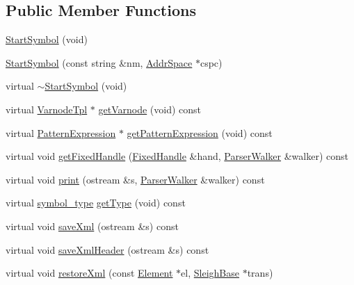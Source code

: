 \subsection*{Public Member Functions}
\begin{DoxyCompactItemize}
\item 
\mbox{\hyperlink{class_start_symbol_a038b771f197b5218dedf7aa2ee41aa9f}{Start\+Symbol}} (void)
\item 
\mbox{\hyperlink{class_start_symbol_a2b7b7d19a42d3d5d0c271c81f4a35d31}{Start\+Symbol}} (const string \&nm, \mbox{\hyperlink{class_addr_space}{Addr\+Space}} $\ast$cspc)
\item 
virtual \mbox{\hyperlink{class_start_symbol_a0154c71a007b7c4dd3e57e4016fc65fc}{$\sim$\+Start\+Symbol}} (void)
\item 
virtual \mbox{\hyperlink{class_varnode_tpl}{Varnode\+Tpl}} $\ast$ \mbox{\hyperlink{class_start_symbol_a1f8a44a3f3f69018161563f7dc0a4d74}{get\+Varnode}} (void) const
\item 
virtual \mbox{\hyperlink{class_pattern_expression}{Pattern\+Expression}} $\ast$ \mbox{\hyperlink{class_start_symbol_aeeb32a702943ac0da1178cdf97e7002f}{get\+Pattern\+Expression}} (void) const
\item 
virtual void \mbox{\hyperlink{class_start_symbol_addda2db4266dfadb0158a6a305edff69}{get\+Fixed\+Handle}} (\mbox{\hyperlink{struct_fixed_handle}{Fixed\+Handle}} \&hand, \mbox{\hyperlink{class_parser_walker}{Parser\+Walker}} \&walker) const
\item 
virtual void \mbox{\hyperlink{class_start_symbol_a973289b5a20d276346089365cc24905f}{print}} (ostream \&s, \mbox{\hyperlink{class_parser_walker}{Parser\+Walker}} \&walker) const
\item 
virtual \mbox{\hyperlink{class_sleigh_symbol_aba70f7f332fd63488c5ec4bd7807db41}{symbol\+\_\+type}} \mbox{\hyperlink{class_start_symbol_a6c672bdde679f497bc852befabc297bd}{get\+Type}} (void) const
\item 
virtual void \mbox{\hyperlink{class_start_symbol_a112704e744706c7787bdc7a594845b47}{save\+Xml}} (ostream \&s) const
\item 
virtual void \mbox{\hyperlink{class_start_symbol_add42ff46eba0c8adbc75164f8ac7780d}{save\+Xml\+Header}} (ostream \&s) const
\item 
virtual void \mbox{\hyperlink{class_start_symbol_a8bffa932c38139afeacdafdbb8611c2f}{restore\+Xml}} (const \mbox{\hyperlink{class_element}{Element}} $\ast$el, \mbox{\hyperlink{class_sleigh_base}{Sleigh\+Base}} $\ast$trans)
\end{DoxyCompactItemize}
